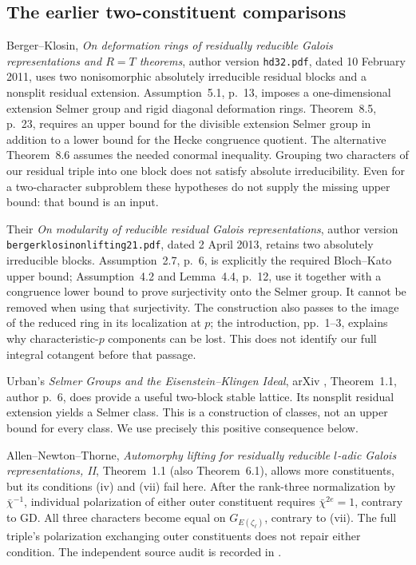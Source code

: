 \documentclass[11pt,a4paper]{article}
\theoremstyle{definition}
\begin{document}
\subsection{The earlier two-constituent comparisons}

Berger--Klosin, \emph{On deformation rings of residually
reducible Galois representations and $R=T$ theorems},
author version \texttt{hd32.pdf}, dated 10 February 2011,
uses two nonisomorphic absolutely irreducible residual
blocks and a nonsplit residual extension.  Assumption~5.1,
p.~13, imposes a one-dimensional extension Selmer group
and rigid diagonal deformation rings.  Theorem~8.5,
p.~23, requires an upper bound for the divisible extension
Selmer group in addition to a lower bound for the Hecke
congruence quotient.  The alternative Theorem~8.6 assumes
the needed conormal inequality.  Grouping two characters
of our residual triple into one block does not satisfy
absolute irreducibility.  Even for a two-character
subproblem these hypotheses do not supply the missing
upper bound: that bound is an input.

Their \emph{On modularity of reducible residual Galois
representations}, author version
\texttt{bergerklosinonlifting21.pdf}, dated 2 April 2013,
retains two absolutely irreducible blocks.  Assumption~2.7,
p.~6, is explicitly the required Bloch--Kato upper bound;
Assumption~4.2 and Lemma~4.4, p.~12, use it together with
a congruence lower bound to prove surjectivity onto the
Selmer group.  It cannot be removed when using that
surjectivity.  The construction also passes to the image
of the reduced ring in its localization at $p$; the
introduction, pp.~1--3, explains why characteristic-$p$
components can be lost.  This does not identify our full
integral cotangent before that passage.

Urban's \emph{Selmer Groups and the Eisenstein--Klingen
Ideal}, arXiv , Theorem~1.1,
author p.~6, does provide a useful two-block stable
lattice.  Its nonsplit residual extension yields a
Selmer class.  This is a construction of classes, not
an upper bound for every class.  We use precisely this
positive consequence below.

Allen--Newton--Thorne, \emph{Automorphy lifting for
residually reducible $l$-adic Galois representations, II},
Theorem~1.1 (also Theorem~6.1), allows more constituents,
but its conditions (iv) and (vii) fail here.  After the
rank-three normalization by $\bar\chi^{-1}$, individual
polarization of either outer constituent requires
$\bar\chi^{2e}=1$, contrary to GD.  All three characters
become equal on $G_{E(\zeta_\ell)}$, contrary to (vii).
The full triple's polarization exchanging outer
constituents does not repair either condition.  The
independent source audit is recorded in
.
\end{document}
